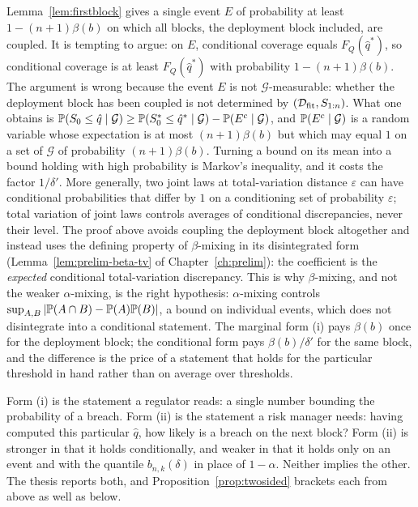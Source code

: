 \documentclass[../../../main.tex]{subfiles}
\begin{document}
\begin{remark}\label{rem:jointtv}
Lemma~\ref{lem:firstblock} gives a single event $E$ of probability at least $1-(n+1)\beta(b)$ on which all blocks, the deployment block included, are coupled. It is tempting to argue: on $E$, conditional coverage equals $F_Q(\hat q^*)$, so conditional coverage is at least $F_Q(\hat q^*)$ with probability $1-(n+1)\beta(b)$. The argument is wrong because the event $E$ is not $\mathcal G$-measurable: whether the deployment block has been coupled is not determined by $(\mathcal D_{\mathrm{fit}},S_{1:n})$. What one obtains is $\mathbb{P}(S_0\le\hat q\mid\mathcal G)\ge\mathbb{P}(S^*_0\le\hat q^*\mid\mathcal G)-\mathbb{P}(E^c\mid\mathcal G)$, and $\mathbb{P}(E^c\mid\mathcal G)$ is a random variable whose expectation is at most $(n+1)\beta(b)$ but which may equal $1$ on a set of $\mathcal G$ of probability $(n+1)\beta(b)$. Turning a bound on its mean into a bound holding with high probability is Markov's inequality, and it costs the factor $1/\delta'$. More generally, two joint laws at total-variation distance $\varepsilon$ can have conditional probabilities that differ by $1$ on a conditioning set of probability $\varepsilon$; total variation of joint laws controls averages of conditional discrepancies, never their level. The proof above avoids coupling the deployment block altogether and instead uses the defining property of $\beta$-mixing in its disintegrated form (Lemma~\ref{lem:prelim-beta-tv} of Chapter~\ref{ch:prelim}): the coefficient is the \emph{expected} conditional total-variation discrepancy. This is why $\beta$-mixing, and not the weaker $\alpha$-mixing, is the right hypothesis: $\alpha$-mixing controls $\sup_{A,B}|\mathbb{P}(A\cap B)-\mathbb{P}(A)\mathbb{P}(B)|$, a bound on individual events, which does not disintegrate into a conditional statement. The marginal form (i) pays $\beta(b)$ once for the deployment block; the conditional form pays $\beta(b)/\delta'$ for the same block, and the difference is the price of a statement that holds for the particular threshold in hand rather than on average over thresholds.
\end{remark}

\begin{remark}
Form (i) is the statement a regulator reads: a single number bounding the probability of a breach. Form (ii) is the statement a risk manager needs: having computed this particular $\hat q$, how likely is a breach on the next block? Form (ii) is stronger in that it holds conditionally, and weaker in that it holds only on an event and with the quantile $b_{n,k}(\delta)$ in place of $1-\alpha$. Neither implies the other. The thesis reports both, and Proposition~\ref{prop:twosided} brackets each from above as well as below.
\end{remark}
\end{document}
